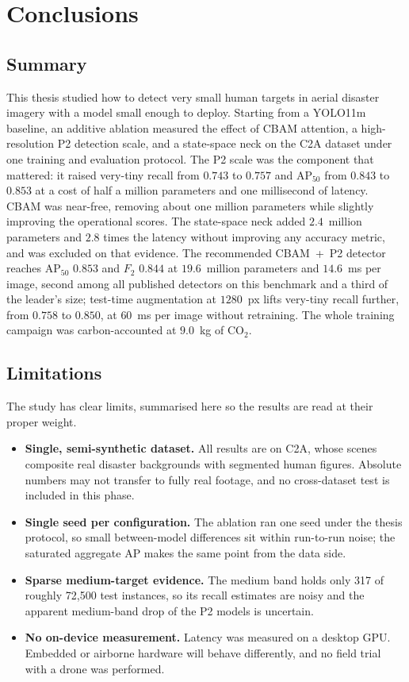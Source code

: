 \chapter{Conclusions}

\section{Summary}
This thesis studied how to detect very small human targets in aerial disaster
imagery with a model small enough to deploy. Starting from a YOLO11m
baseline, an additive ablation measured the effect of CBAM attention, a
high-resolution P2 detection scale, and a state-space neck on the C2A dataset
under one training and evaluation protocol. The P2 scale was the component
that mattered: it raised very-tiny recall from $0.743$ to $0.757$ and
$\mathrm{AP}_{50}$ from $0.843$ to $0.853$ at a cost of half a million
parameters and one millisecond of latency. CBAM was near-free, removing about
one million parameters while slightly improving the operational scores. The
state-space neck added $2.4$~million parameters and $2.8$ times the latency
without improving any accuracy metric, and was excluded on that evidence. The
recommended CBAM~+~P2 detector reaches $\mathrm{AP}_{50}$ $0.853$ and $F_2$
$0.844$ at $19.6$~million parameters and $14.6$~ms per image, second among
all published detectors on this benchmark and a third of the leader's size;
test-time augmentation at $1280$~px lifts very-tiny recall further, from
$0.758$ to $0.850$, at $60$~ms per image without retraining. The whole
training campaign was carbon-accounted at $9.0$~kg of CO$_2$.

\section{Limitations}
The study has clear limits, summarised here so the results are read at their
proper weight.
\begin{itemize}
  \item \textbf{Single, semi-synthetic dataset.} All results are on C2A,
        whose scenes composite real disaster backgrounds with segmented
        human figures. Absolute numbers may not transfer to fully real
        footage, and no cross-dataset test is included in this phase.
  \item \textbf{Single seed per configuration.} The ablation ran one seed
        under the thesis protocol, so small between-model differences sit
        within run-to-run noise; the saturated aggregate AP makes the same
        point from the data side.
  \item \textbf{Sparse medium-target evidence.} The medium band holds only
        317 of roughly 72{,}500 test instances, so its recall estimates are
        noisy and the apparent medium-band drop of the P2 models is
        uncertain.
  \item \textbf{No on-device measurement.} Latency was measured on a desktop
        GPU. Embedded or airborne hardware will behave differently, and no
        field trial with a drone was performed.
\end{itemize}

